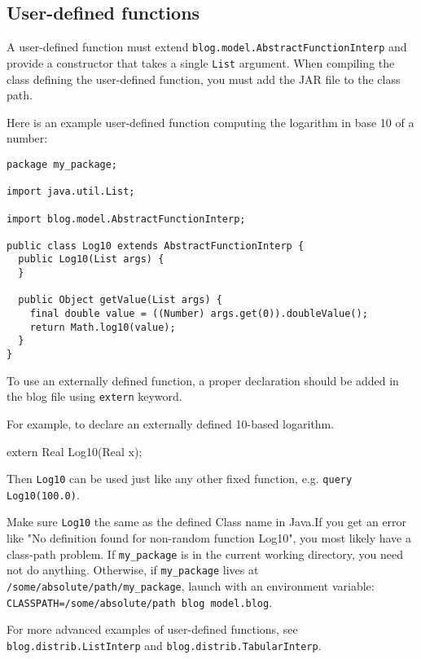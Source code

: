 \subsection{User-defined functions}\label{user-defined-function-section}

A user-defined function must extend \verb|blog.model.AbstractFunctionInterp|
and provide a constructor that takes a single \verb|List| argument. When
compiling the class defining the user-defined function, you must add the \bl
JAR file to the class path.

Here is an example user-defined function computing the logarithm in base 10 of
a number:

\begin{verbatim}
package my_package;

import java.util.List;

import blog.model.AbstractFunctionInterp;

public class Log10 extends AbstractFunctionInterp {
  public Log10(List args) {
  }

  public Object getValue(List args) {
    final double value = ((Number) args.get(0)).doubleValue();
    return Math.log10(value);
  }
}
\end{verbatim}

To use an externally defined function, a proper declaration should be added in the blog file using \verb|extern| keyword. 

For example, to declare an externally defined 10-based logarithm. 
\begin{blogcode}
extern Real Log10(Real x);
\end{blogcode}

Then \verb|Log10| can be used just like any other fixed function, e.g.
\verb|query Log10(100.0)|.

Make sure \verb|Log10|  the same as the defined Class name in Java.If you get an error like "No
definition found for non-random function Log10", you most likely have a
class-path problem. If \verb|my_package| is in the current working directory,
you need not do anything. Otherwise, if \verb|my_package| lives at
\verb|/some/absolute/path/my_package|, launch \bl with an environment variable:
{\tt CLASSPATH=/some/absolute/path blog model.blog}.

For more advanced examples of user-defined functions, see
\verb|blog.distrib.ListInterp| and \verb|blog.distrib.TabularInterp|.



